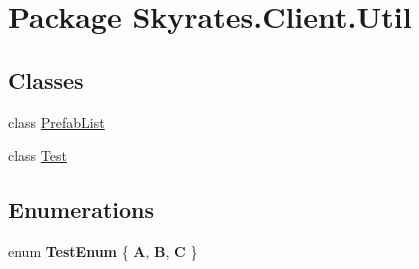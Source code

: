 \hypertarget{namespace_skyrates_1_1_client_1_1_util}{\section{Package Skyrates.\-Client.\-Util}
\label{namespace_skyrates_1_1_client_1_1_util}
}
\subsection*{Classes}
\begin{DoxyCompactItemize}
\item 
class \hyperlink{class_skyrates_1_1_client_1_1_util_1_1_prefab_list}{Prefab\-List}
\item 
class \hyperlink{class_skyrates_1_1_client_1_1_util_1_1_test}{Test}
\end{DoxyCompactItemize}
\subsection*{Enumerations}
\begin{DoxyCompactItemize}
\item 
enum {\bfseries Test\-Enum} \{ {\bfseries A}, 
{\bfseries B}, 
{\bfseries C}
 \}
\end{DoxyCompactItemize}
